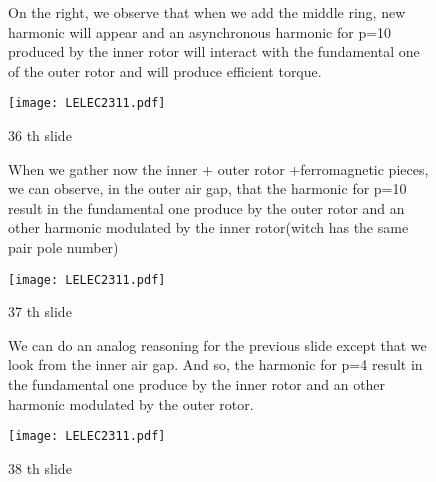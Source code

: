 \begin{figure}[H]
    \begin{minipage}{.45\linewidth}
    On the right, we observe that when we add the middle ring, new harmonic will appear and an asynchronous harmonic for p=10 produced by the inner rotor will interact with the fundamental one of the outer rotor and will produce efficient torque.
 
       
    \end{minipage}
    \hfill%
    \begin{minipage}[c]{.45\linewidth}
        \centering
        \texttt{[image: LELEC2311.pdf]}
        \caption{36 th slide}
    \end{minipage}
\end{figure}

\begin{figure}[H]
    \begin{minipage}{.45\linewidth}
    When we gather now the inner + outer rotor +ferromagnetic pieces, we can observe, in the outer air gap, that the harmonic for p=10 result in the fundamental one produce by the outer rotor and an other harmonic modulated by the inner rotor(witch has the same pair pole number)
 
       
    \end{minipage}
    \hfill%
    \begin{minipage}[c]{.45\linewidth}
        \centering
        \texttt{[image: LELEC2311.pdf]}
        \caption{37 th slide}
    \end{minipage}
\end{figure}

\begin{figure}[H]
    \begin{minipage}{.45\linewidth}
    We can do an analog reasoning for the previous slide except that we look from the inner air gap. And so, the harmonic for p=4 result in the fundamental one produce by the inner rotor and an other harmonic modulated by the outer rotor.
 
       
    \end{minipage}
    \hfill%
    \begin{minipage}[c]{.45\linewidth}
        \centering
        \texttt{[image: LELEC2311.pdf]}
        \caption{38 th slide}
    \end{minipage}
\end{figure}

